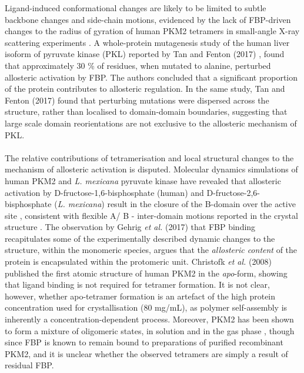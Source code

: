 Ligand-induced conformational changes are likely to be limited to subtle backbone changes and side-chain motions, evidenced by the lack of FBP-driven changes to the radius of gyration of human PKM2 tetramers in small-angle X-ray scattering experiments \cite{Yan:2016aa}. A whole-protein mutagenesis study of the human liver isoform of pyruvate kinase (PKL) reported by Tan and Fenton (2017) \cite{Tang:2017aa}, found that approximately 30 \% of residues, when mutated to alanine, perturbed allosteric activation by FBP. The authors concluded that a significant proportion of the protein contributes to allosteric regulation. In the same study, Tan and Fenton (2017) \cite{Tang:2017aa} found that perturbing mutations were dispersed across the structure, rather than localised to domain-domain boundaries, suggesting that large scale domain reorientations are not exclusive to the allosteric mechanism of PKL. 
%
%
\\\\
%
%
The relative contributions of tetramerisation and local structural changes to the mechanism of allosteric activation is disputed. Molecular dynamics simulations of human PKM2 and \textit{L. mexicana} pyruvate kinase have revealed that allosteric activation by D-fructose-1,6-bisphosphate (human) and D-fructose-2,6-bisphosphate (\textit{L. mexicana}) result in the closure of the B-domain over the active site \cite{Naithani:2015aa,Gehrig:2017aa}, consistent with flexible A/ B - inter-domain motions reported in the crystal structure \cite{Srivastava:2017aa,Dombrauckas:2005aa}. The observation by Gehrig \textit{et al.} (2017) \cite{Gehrig:2017aa} that FBP binding recapitulates some of the experimentally described dynamic changes to the structure, within the monomeric species, argues that the \textit{allosteric content} of the protein is encapsulated within the protomeric unit. Christofk \textit{et al.} (2008) \cite{Christofk:2008aa} published the first atomic structure of human PKM2 in the \textit{apo}-form, showing that ligand binding is not required for tetramer formation. It is not clear, however, whether apo-tetramer formation is an artefact of the high protein concentration used for crystallisation (80 mg/mL), as polymer self-assembly is inherently a concentration-dependent process. Moreover, PKM2 has been shown to form a mixture of oligomeric states, in solution \cite{Morgan:2013aa} and in the gas phase \cite{Gavriilidou:2018aa}, though since FBP is known to remain bound to preparations of purified recombinant PKM2, and it is unclear whether the observed tetramers are simply a result of residual FBP.
